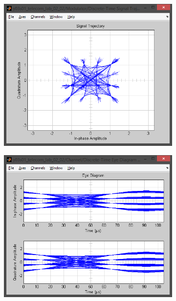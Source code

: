 \documentclass[
	a4paper,
	oneside,
	BCOR = 10mm,
	DIV = 12,
	12pt,
	headings = normal,
]{scrartcl}
\begin{document}
\begin{figure}[!htbp]
\begin{subfigure}{\textwidth / 3}
						\caption{}
						\label{subfig:fracdelay-signal-trajectory-in}
					\end{subfigure}%
					\begin{subfigure}{\textwidth / 3}
						\centering
						\includegraphics[height = 7\baselineskip]{../01-solution/00-SNR-100db-noshift-modulator-signal-trajectory.png}
						\caption{}
						\label{subfig:fracdelay-scatter-plot-in}
					\end{subfigure}
					\begin{subfigure}{\textwidth / 3}
						\centering
						\includegraphics[height = 7\baselineskip]{../01-solution/03-fracdelay-3p0-channel-eye-diagram.png}

\end{subfigure}
\end{figure}
\end{document}
